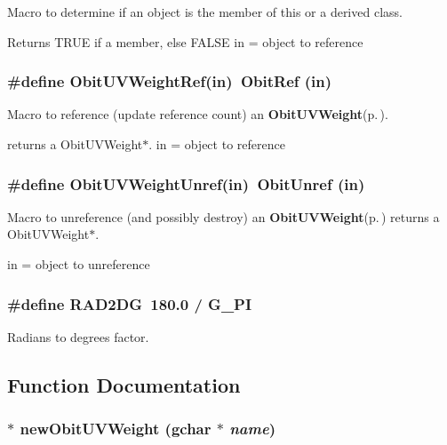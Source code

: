 Macro to determine if an object is the member of this or a derived class. 

Returns TRUE if a member, else FALSE in = object to reference 
\subsubsection{\setlength{\rightskip}{0pt plus 5cm}\#define Obit\-UVWeight\-Ref(in)\ Obit\-Ref (in)}\label{ObitUVWeight_8c_a3}


Macro to reference (update reference count) an {\bf Obit\-UVWeight}{\rm (p.\,\pageref{structObitUVWeight})}. 

returns a Obit\-UVWeight$\ast$. in = object to reference 
\subsubsection{\setlength{\rightskip}{0pt plus 5cm}\#define Obit\-UVWeight\-Unref(in)\ Obit\-Unref (in)}\label{ObitUVWeight_8c_a2}


Macro to unreference (and possibly destroy) an {\bf Obit\-UVWeight}{\rm (p.\,\pageref{structObitUVWeight})} returns a Obit\-UVWeight$\ast$. 

in = object to unreference 
\subsubsection{\setlength{\rightskip}{0pt plus 5cm}\#define RAD2DG\ 180.0 / G\_\-PI}\label{ObitUVWeight_8c_a1}


Radians to degrees factor. 



\subsection{Function Documentation}
\subsubsection{$\ast$ new\-Obit\-UVWeight (gchar $\ast$ {\em name})}\label{ObitUVWeight_8c_a19}


